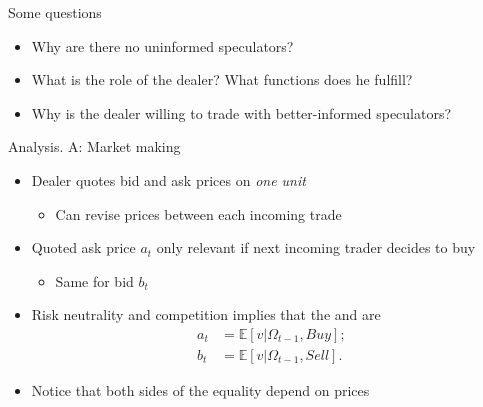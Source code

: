 \documentclass[english,10pt
,aspectratio=169
]{beamer}
\begin{document}
\begin{frame}{Some questions}
\begin{itemize}[<+->]
	\item Why are there no uninformed speculators?
	\item What is the role of the dealer? What functions does he fulfill?
	\item Why is the dealer willing to trade with better-informed speculators?
\end{itemize}
\end{frame}


\begin{frame}{Analysis. A: Market making}
\begin{itemize}[<+->]
	\item Dealer quotes bid and ask prices on \textit{one unit}
	\begin{itemize}
		\item Can revise prices between each incoming trade
	\end{itemize}
	\item Quoted ask price $a_t$ only relevant if next incoming trader decides to buy
	\begin{itemize}
		\item Same for bid $b_t$
	\end{itemize}
	\item Risk neutrality and competition implies that the  and  are
	\begin{align*}
		a_t & = \mathbb{E}[v|\Omega_{t-1}, Buy]; \\
		b_t &= \mathbb{E}[v|\Omega_{t-1},  Sell].
	\end{align*}
	\item Notice that both sides of the equality depend on prices
\end{itemize}
\end{frame}
\end{document}
